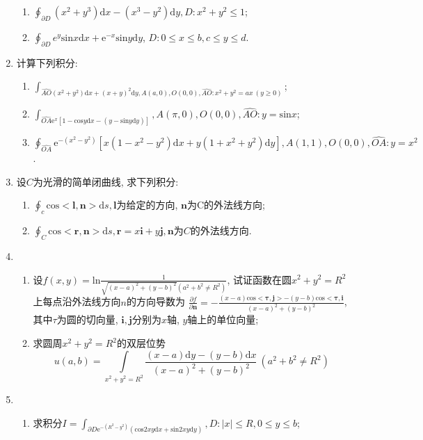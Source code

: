 \begin{enumerate}
\begin{enumerate}
	\item $\displaystyle{\oint_{\partial D}(x^2+y^3)\mathrm{d}x-(x^3-y^2)\mathrm{d}y}, D: x^2+y^2\le 1$;
	\item $\displaystyle{\oint_{\partial D}e^y\mathrm{sin}x\mathrm{d}x+\mathrm{e}^{-x}\mathrm{sin}y\mathrm{d}y}$, $D: 0\le x\le b,c\le y\le d$.
\end{enumerate}
\item 计算下列积分:
\begin{enumerate}
	\item $\displaystyle{\int_{\widehat{AO}(x^2+y^2)\mathrm{d}x+(x+y)^2\mathrm{d}y, A(a,0),O(0,0),\widehat{AO}:x^2+y^2=ax\ (y\ge 0)}}$;
		\item $\displaystyle{\int_{\widehat{OA}\mathrm{e}^x[1-\mathrm{cos}y\mathrm{d}x-(y-\mathrm{sin}y\mathrm{d}y)]},A(\pi,0),O(0,0),\widehat{AO}:y=\mathrm{sin}x}$;
		\item $\displaystyle{\oint_{\widehat{OA}}\mathrm{e}^{-(x^2-y^2)}[x(1-x^2-y^2)\mathrm{d}x+y(1+x^2+y^2)\mathrm{d}y],A(1,1),O(0,0),\widehat{OA}:y=x^2}$.
\end{enumerate}
\item 设$C$为光滑的简单闭曲线, 求下列积分:
\begin{enumerate}
	\item $\displaystyle{\oint_{c}\mathrm{cos}<\bm{l},\bm{n}>\mathrm{d}s,\bm{l}}$为给定的方向, $\bm{n}$为C的外法线方向;
	\item $\displaystyle{\oint_{C}\mathrm{cos}<\bm{r},\bm{n}>\mathrm{d}s,\bm{r}=x\bm{i}+y\bm{j},\bm{n}}$为$C$的外法线方向.
\end{enumerate}
\item 
\begin{enumerate}
	\item 设$f(x,y)=\mathrm{ln}\frac{1}{\sqrt{(x-a)^2+(y-b)^2}(a^2+b^2\ne R^2)}$, 试证函数在圆$x^2+y^2=R^2$上每点沿外法线方向$n$的方向导数为
	$\frac{\partial f}{\partial \bm{n}}=-\frac{(x-a)\mathrm{cos}<\bm{\tau},\bm{j}>-(y-b)\mathrm{cos}<\bm{\tau,\bm{i}}}{(x-a)^2+(y-b)^2}$,
	其中$\tau$为圆的切向量, $\bm{i,j}$分别为$x$轴, $y$轴上的单位向量;
	\item 求圆周$x^2+y^2=R^2$的双层位势
	$$ u(a,b) = \displaystyle{\int\limits_{x^2+y^2=R^2}\frac{(x-a)\mathrm{d}y-(y-b)\mathrm{d}x}{(x-a)^2+(y-b)^2}}\ (a^2+b^2\ne R^2)$$
\end{enumerate}
\item 
\begin{enumerate}
	\item 求积分$I=\displaystyle{\int_{\partial D\mathrm{e}^{-(R^2-y^2)}(\mathrm{cos}2xy\mathrm{d}x+\mathrm{sin}2xy\mathrm{d}y)}, D: |x|\le R,0\le y\le b}$;

\end{enumerate}
\end{enumerate}
